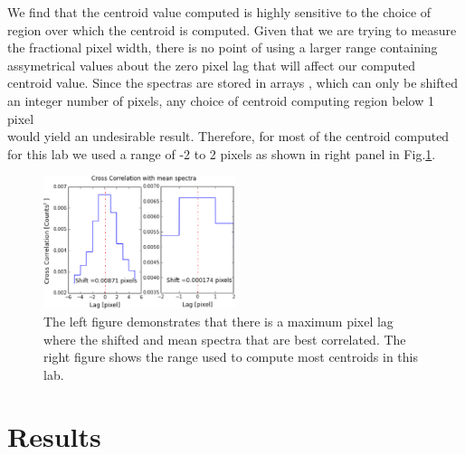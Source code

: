 \documentclass[authoryear, 12pt,5p, times]{elsarticle}
\begin{document}
We find that the centroid value computed is highly sensitive to the choice of region over which the centroid is computed. Given that we are trying to measure the fractional pixel width, there is no point of using a larger range containing assymetrical values about the zero pixel lag that will affect our computed centroid value. Since the spectras are stored in arrays , which can only be shifted an integer number of pixels, any choice of centroid computing region below 1 pixel \\would yield an undesirable result. Therefore, for most of the centroid computed for this lab we used a range of -2 to 2 pixels as shown in right panel in Fig.\ref{autocorr_curve}. 
\begin{figure}[h!]
\includegraphics[width=0.5\textwidth]{figures/autocorr_curve}
\caption{ The left figure demonstrates that there is a maximum pixel lag where the shifted and mean spectra that are best correlated. The right figure shows the range used to compute most centroids in this lab.}
\label{autocorr_curve}
\end{figure}
\section{Results}
\end{document}
